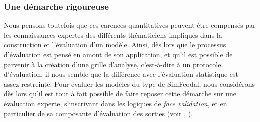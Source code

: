 \subsubsection{Une démarche rigoureuse} Nous pensons toutefois que ces carences quantitatives peuvent être compensés par les connaissances expertes des différents thématiciens impliqués dans la construction et l'évaluation d'un modèle.
Ainsi, dès lors que le processus d'évaluation est pensé en amont de son application, et qu'il est possible de parvenir à la création d'une grille d'analyse, c'est-à-dire à un protocole d'évaluation, il nous semble que la différence avec l'évaluation statistique est assez restreinte.
Pour évaluer les modèles du type de SimFeodal, nous considérons dès lors qu'il est tout à fait possible de faire reposer cette démarche sur une évaluation experte, s'inscrivant dans les logiques de \textit{face validation}, et en particulier de sa composante d'évaluation des sorties (voir , ).


